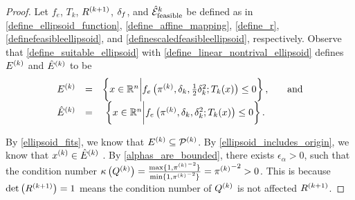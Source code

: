 \documentclass{article}
\begin{document}
\begin{proof}

Let 
$f_e$,
$T_k$,
${R^{(k+1)}}$, $\delta_{f}$, and ${{\mathcal {\hat E}_{\text{feasible}}}^k}$
be defined as in
\cref{define_ellipsoid_function},
\cref{define_affine_mapping},
\cref{define_r},
\cref{definefeasibleellipsoid}, and
\cref{definescaledfeasibleellipsoid},
respectively. 
Observe that \cref{define_suitable_ellipsoid} with \cref{define_linear_nontrival_ellipsoid} defines  ${E^{(k)}}$ and ${{\hat E}^{(k)}}$ to be
\begin{align*}
\begin{array}{cccc}
{E^{(k)}} &=& \left\{x \in \mathbb R^n \bigg | f_e\left(\pi^{(k)}, \delta_k, \frac 1 2 \delta_k^2; T_k(x)\right) \le 0\right\}, &\quad \textrm{and}  \\
{{\hat E}^{(k)}} &=& \left\{x \in \mathbb R^n \bigg | f_e\left({\pi^{(k)}}, \delta_k, \delta_k^2; T_k(x)\right) \le 0\right\}.&
\end{array}
\end{align*}

By \cref{ellipsoid_fits}, we know that ${E^{(k)}} \subseteq {{\mathcal{P}}^{(k)}}$.
By \cref{ellipsoid_includes_origin}, we know that $x^{(k)} \in {{\hat E}^{(k)}}$ .
By \cref{alphas_are_bounded}, there exists $\epsilon_{\alpha} > 0$, such that the condition number 
${\kappa}\left({Q^{(k)}}\right) = \frac{\max\{1, {\pi^{(k)}}^{-2}\}}{\min\{1, {\pi^{(k)}}^{-2}\}} = {\pi^{(k)}}^{-2} > 0$.
This is because $\det\left({R^{(k+1)}}\right) = 1$ means the condition number of ${Q^{(k)}}$ is not affected ${R^{(k+1)}}$.
\end{proof}


\end{document}
